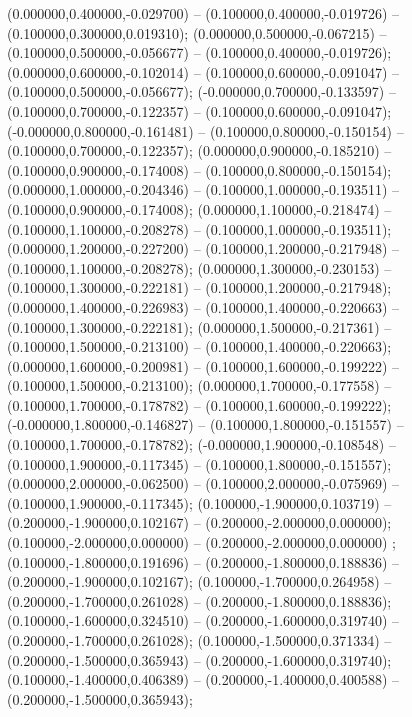  (0.000000,0.400000,-0.029700) -- (0.100000,0.400000,-0.019726) -- (0.100000,0.300000,0.019310);
 (0.000000,0.500000,-0.067215) -- (0.100000,0.500000,-0.056677) -- (0.100000,0.400000,-0.019726);
 (0.000000,0.600000,-0.102014) -- (0.100000,0.600000,-0.091047) -- (0.100000,0.500000,-0.056677);
 (-0.000000,0.700000,-0.133597) -- (0.100000,0.700000,-0.122357) -- (0.100000,0.600000,-0.091047);
 (-0.000000,0.800000,-0.161481) -- (0.100000,0.800000,-0.150154) -- (0.100000,0.700000,-0.122357);
 (0.000000,0.900000,-0.185210) -- (0.100000,0.900000,-0.174008) -- (0.100000,0.800000,-0.150154);
 (0.000000,1.000000,-0.204346) -- (0.100000,1.000000,-0.193511) -- (0.100000,0.900000,-0.174008);
 (0.000000,1.100000,-0.218474) -- (0.100000,1.100000,-0.208278) -- (0.100000,1.000000,-0.193511);
 (0.000000,1.200000,-0.227200) -- (0.100000,1.200000,-0.217948) -- (0.100000,1.100000,-0.208278);
 (0.000000,1.300000,-0.230153) -- (0.100000,1.300000,-0.222181) -- (0.100000,1.200000,-0.217948);
 (0.000000,1.400000,-0.226983) -- (0.100000,1.400000,-0.220663) -- (0.100000,1.300000,-0.222181);
 (0.000000,1.500000,-0.217361) -- (0.100000,1.500000,-0.213100) -- (0.100000,1.400000,-0.220663);
 (0.000000,1.600000,-0.200981) -- (0.100000,1.600000,-0.199222) -- (0.100000,1.500000,-0.213100);
 (0.000000,1.700000,-0.177558) -- (0.100000,1.700000,-0.178782) -- (0.100000,1.600000,-0.199222);
 (-0.000000,1.800000,-0.146827) -- (0.100000,1.800000,-0.151557) -- (0.100000,1.700000,-0.178782);
 (-0.000000,1.900000,-0.108548) -- (0.100000,1.900000,-0.117345) -- (0.100000,1.800000,-0.151557);
 (0.000000,2.000000,-0.062500) -- (0.100000,2.000000,-0.075969) -- (0.100000,1.900000,-0.117345);
 (0.100000,-1.900000,0.103719) -- (0.200000,-1.900000,0.102167) -- (0.200000,-2.000000,0.000000);
 (0.100000,-2.000000,0.000000) -- (0.200000,-2.000000,0.000000) ;
 (0.100000,-1.800000,0.191696) -- (0.200000,-1.800000,0.188836) -- (0.200000,-1.900000,0.102167);
 (0.100000,-1.700000,0.264958) -- (0.200000,-1.700000,0.261028) -- (0.200000,-1.800000,0.188836);
 (0.100000,-1.600000,0.324510) -- (0.200000,-1.600000,0.319740) -- (0.200000,-1.700000,0.261028);
 (0.100000,-1.500000,0.371334) -- (0.200000,-1.500000,0.365943) -- (0.200000,-1.600000,0.319740);
 (0.100000,-1.400000,0.406389) -- (0.200000,-1.400000,0.400588) -- (0.200000,-1.500000,0.365943);
